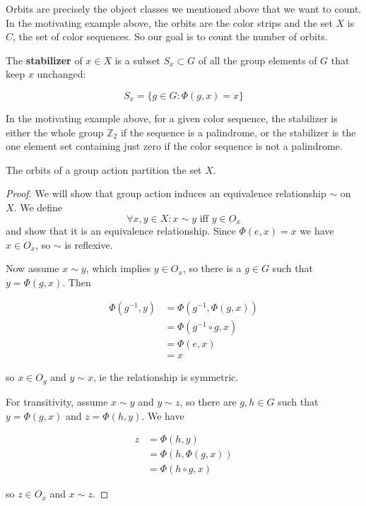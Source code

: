 Orbits are precisely the object classes we mentioned above that we want to count. In the motivating example above, the orbits are the color strips and the set $X$ is $C$, the set of color sequences. So our goal is to count the number of orbits.

\begin{defn}\label{stabilizer}
The \textbf{stabilizer} of $x \in X$ is a subset $S_x \subset G$ of all the group elements of $G$ that keep $x$ unchanged:

$$
S_x = \{g \in G: \Phi(g, x) = x\}
$$
\end{defn}

In the motivating example above, for a given color sequence, the stabilizer is either the whole group $\mathbb{Z}_2$ if the sequence is a palindrome, or the stabilizer is the one element set containing just zero if the color sequence is not a palindrome.

\begin{thm}\label{orbitspartition}
The orbits of a group action partition the set $X$.
\end{thm}

\begin{proof}
We will show that group action induces an equivalence relationship $\sim$ on $X$.
We define 
$$
\forall x, y \in X: x \sim y \text{ iff } y \in O_x
$$
and show that it is an equivalence relationship. Since $\Phi(e, x) = x$ we have $x \in O_x$, so $\sim$ is reflexive.

Now assume $x \sim y$, which implies $y \in O_x$, so there is a $g \in G$ such that $y = \Phi(g, x)$. Then

\begin{align*}
\Phi(g^{-1}, y) &= \Phi(g^{-1}, \Phi(g, x)) \\
                &= \Phi(g^{-1} \circ g, x) \\
                &= \Phi(e, x) \\
                &= x
\end{align*}

so $x \in O_y$ and $y \sim x$, ie the relationship is symmetric.

For transitivity, assume $x \sim y$ and $y \sim z$, so there are $g,h \in G$ such that $y = \Phi(g, x)$ and $z = \Phi(h, y)$. We have

\begin{align*}
z &= \Phi(h, y) \\
  &= \Phi(h, \Phi(g, x)) \\
  &= \Phi(h \circ g, x)
\end{align*}

so $z \in O_x$ and $x \sim z$.

\end{proof}


